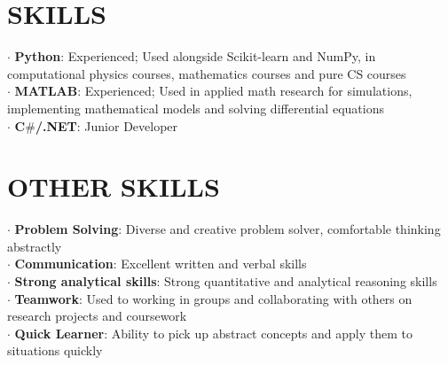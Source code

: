 \documentclass[margin]{res}
\begin{document}
\begin{resume}
\section{SKILLS}
    $\cdot$ \textbf{Python}: Experienced; Used alongside Scikit-learn and NumPy, in computational physics courses, mathematics courses and pure CS courses\\
    $\cdot$ \textbf{MATLAB}: Experienced; Used in applied math research for simulations, implementing mathematical models and solving differential equations\\
    $\cdot$ \textbf{C$\#$/.NET}: Junior Developer\\
    
\section{OTHER SKILLS}
    $\cdot$ \textbf{Problem Solving}: Diverse and creative problem solver, comfortable thinking abstractly \\
    $\cdot$ \textbf{Communication}: Excellent written and verbal skills\\
    $\cdot$ \textbf{Strong analytical skills}: Strong quantitative and analytical reasoning skills\\
    $\cdot$ \textbf{Teamwork}: Used to working in groups and collaborating with others on research projects and coursework \\
    $\cdot$ \textbf{Quick Learner}: Ability to pick up abstract concepts and apply them to situations quickly\\

\end{resume}
\end{document}
